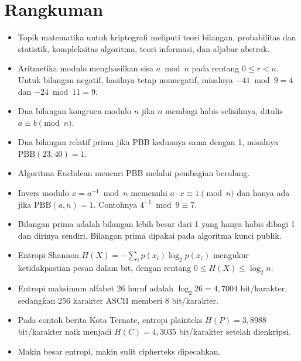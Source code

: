 \section{Rangkuman}
\begin{itemize}
    \item Topik matematika untuk kriptografi meliputi teori bilangan,
          probabilitas dan statistik, kompleksitas algoritma, teori informasi,
          dan aljabar abstrak.
    \item Aritmetika modulo menghasilkan sisa $a \bmod n$ pada rentang
          $0 \le r < n$. Untuk bilangan negatif, hasilnya tetap nonnegatif,
          misalnya $-41 \bmod 9 = 4$ dan $-24 \bmod 11 = 9$.
    \item Dua bilangan kongruen modulo $n$ jika $n$ membagi habis selisihnya,
          ditulis $a \equiv b \pmod n$.
    \item Dua bilangan relatif prima jika PBB keduanya sama dengan 1, misalnya
          $\text{PBB}(23,40)=1$.
    \item Algoritma Euclidean mencari PBB melalui pembagian berulang.
    \item Invers modulo $x = a^{-1} \bmod n$ memenuhi $a \cdot x \equiv 1 \pmod n$
          dan hanya ada jika $\text{PBB}(a,n)=1$. Contohnya
          $4^{-1} \bmod 9 \equiv 7$.
    \item Bilangan prima adalah bilangan lebih besar dari 1 yang hanya habis
          dibagi 1 dan dirinya sendiri. Bilangan prima dipakai pada algoritma
          kunci publik.
    \item Entropi Shannon $H(X) = -\sum_i p(x_i)\log_2 p(x_i)$ mengukur
          ketidakpastian pesan dalam bit, dengan rentang $0 \le H(X) \le \log_2 n$.
    \item Entropi maksimum alfabet 26 huruf adalah $\log_2 26 = 4{,}7004$
          bit/karakter, sedangkan 256 karakter ASCII memberi 8 bit/karakter.
    \item Pada contoh berita Kota Ternate, entropi plainteks $H(P) = 3{,}8988$
          bit/karakter naik menjadi $H(C) = 4{,}3035$ bit/karakter setelah
          dienkripsi.
    \item Makin besar entropi, makin sulit cipherteks dipecahkan.
\end{itemize}
